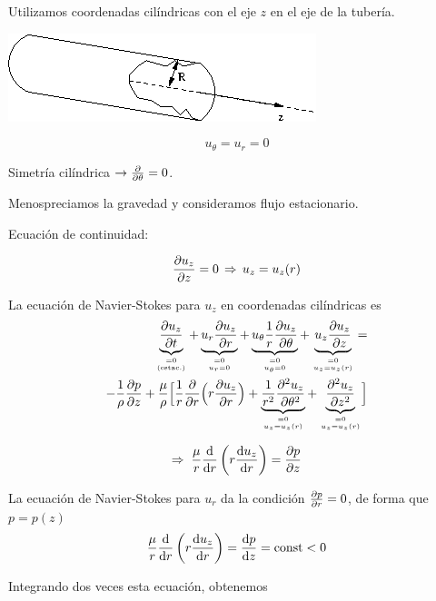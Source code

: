 	Utilizamos coordenadas cilíndricas con el eje $z$ en el eje de la
	tubería.

\begin{center}
	\includegraphics[width=0.5\linewidth]{TeX_files/chapter05-FlujoViscoco/Figures/tubo}
\end{center}

			
			
\begin{equation}
				u_{\theta}=u_{r}=0
\end{equation}
			
			
			Simetría cilíndrica $\rightarrow\frac{\partial }{\partial \theta}=0$.
			
			Menospreciamos la gravedad y consideramos flujo estacionario.
			
			Ecuación de continuidad: 
			
\begin{equation}
				\frac{\partial u_{z}}{\partial z}=0\,\Rightarrow\,u_{z}=u_{z}(r)
\end{equation}
			
	
	La ecuación de Navier-Stokes para $u_{z}$ en coordenadas cilíndricas
	es
	\[
	\begin{split}\underbrace{\dparc{u_{z}}{t}}_{\binom{=0}{\text{(estac.)}}}+\underbrace{u_{r}\dparc{u_{z}}{r}}_{\binom{=0}{u_{r}=0}}+\underbrace{u_{\theta}\frac{1}{r}\dparc{u_{z}}{\theta}}_{\binom{=0}{u_{\theta}=0}}+\underbrace{u_{z}\dparc{u_{z}}{z}}_{\binom{=0}{u_{z}=u_{z}(r)}}=\\
		-\frac{1}{\rho}\dparc{p}{z}+\frac{\mu}{\rho}\Bigl[\frac{1}{r}\dparc{}{r}\Bigl(r\dparc{u_{z}}{r}\Bigr)+\underbrace{\frac{1}{r^{2}}\dparcsec{u_{z}}{\theta}}_{\binom{=0}{u_{z}=u_{z}(r)}}+\underbrace{\dparcsec{u_{z}}{z}}_{\binom{=0}{u_{z}=u_{z}(r)}}\Bigr]
	\end{split}
	\]
	
	
\begin{equation}
		\Rightarrow\;\frac{\mu}{r}\frac{\textrm{d} }{\textrm{d} r}\left(r\frac{\textrm{d} u_{z}}{\textrm{d} r}\right)=\frac{\partial p}{\partial z}
\end{equation}
	
	
	La ecuación de Navier-Stokes para $u_{r}$ da la condición $\frac{\partial p}{\partial r}=0$,
	de forma que $p=p(z)$ 
	\[
	\frac{\mu}{r}\frac{\textrm{d} }{\textrm{d} r}\left(r\frac{\textrm{d} u_{z}}{\textrm{d} r}\right)=\frac{\textrm{d} p}{\textrm{d} z}=\text{const}<0
	\]
	
	
	Integrando dos veces esta ecuación, obtenemos
	
